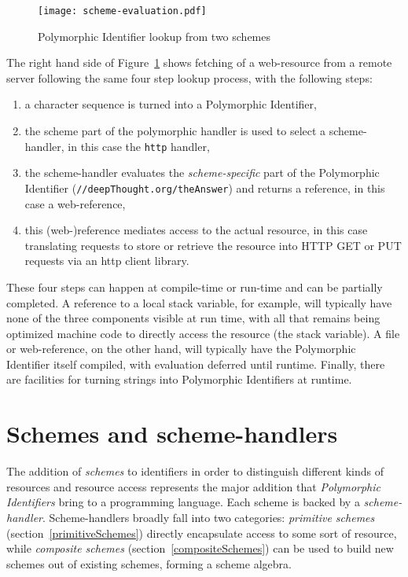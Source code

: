 \documentclass[preprint,authoryear]{llncs}
\begin{document}
\begin{figure}[htbp]
\centering\texttt{[image: scheme-evaluation.pdf]}
\caption{Polymorphic Identifier lookup from two schemes}
\label{scheme-eval}
\end{figure}


The right hand side of Figure~\ref{scheme-eval} shows fetching of a web-resource from
a remote server following the same four step lookup process, with the following steps:

\begin{enumerate}
\item a character sequence is turned into a Polymorphic Identifier,
\item the scheme part of the polymorphic handler is used to select a scheme-handler, in this case the {\tt http} handler,
\item the scheme-handler evaluates the \emph{scheme-specific} part of the Polymorphic Identifier ({\tt //deepThought.org/theAnswer})
	 and returns a reference, in this case a web-reference,
\item this (web-)reference mediates access to the actual resource, in this case translating requests to store or retrieve the 
	resource into HTTP GET or PUT requests via an http client library.
\end{enumerate}

These four steps can happen at compile-time or run-time and can be partially completed.
A reference to a local stack variable, for example, will typically have none of the
three components visible at run time, with all that remains being optimized 
machine code to directly access the resource (the stack variable).
A file or web-reference, on the other hand, will typically have the Polymorphic Identifier itself
compiled, with evaluation deferred until runtime.  Finally, there are facilities
for turning strings into Polymorphic Identifiers at runtime.


\section{Schemes and scheme-handlers}
\label{schemes}
The addition of \emph{schemes} to identifiers in order to distinguish different kinds of resources
and resource access represents
the major addition that \emph{Polymorphic Identifiers} bring to a programming language.
Each scheme is backed by a \emph{scheme-handler}.  Scheme-handlers broadly fall into two categories:
 \emph{primitive schemes} (section~\ref{primitiveSchemes})
directly encapsulate access to some sort of resource, while \emph{composite schemes} (section~\ref{compositeSchemes})
can be used to build new schemes out of existing schemes, forming a scheme algebra.
\end{document}
